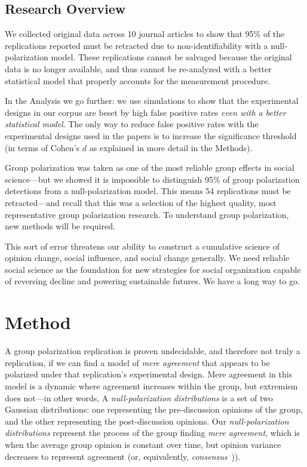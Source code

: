 \documentclass[preview]{article}
\begin{document}
\subsection{Research Overview}

We collected original data across 10 journal articles to show that 95\% of 
the replications reported must be retracted due to non-identifiability with a
null-polarization model. These replications cannot be salvaged because the
original data is no longer available, and thus cannot be re-analyzed with a 
better statistical model that properly accounts for the measurement procedure. 

In the Analysis we go further: we use simulations to show that 
the experimental designs in our corpus are beset by high false positive rates 
\emph{even with a better statistical model}. The only way to reduce false
positive rates with the experimental designs used in the papers is to increase
the significance threshold (in terms of Cohen's $d$ as explained in more
detail in the Methods).

Group polarization was taken as one of the most reliable group effects in social
science—but we showed it is impossible to distinguish 95\% of group
polarization detections from a null-polarization model. This means 54
replications must be retracted—and recall that this was a selection of the
highest quality, most representative group polarization research. 
To understand group polarization, new
methods will be required. 

This sort of error threatens our ability to construct a
cumulative science of opinion change, social influence, and social change
generally. We need reliable social science as the foundation for new
strategies for social organization capable of reversing decline and powering
sustainable futures. We have a long way to go.


\section{Method}

A group polarization replication is proven undecidable, and therefore
not truly a replication, if we can find a model of \emph{mere agreement}
that appears to be polarized under that replication's experimental
design. Mere agreement in this model is a dynamic
where agreement increases within the group, but extremism does not---in
other words, A \emph{null-polarization distributions} is a set of two
Gaussian distributions: one representing the pre-discussion opinions of
the group, and the other representing the post-discussion opinions. Our
\emph{null-polarization distributions} represent the process of the
group finding \emph{mere agreement}, which is when the average group
opinion is constant over time, but opinion variance decreases to
represent agreement (or, equivalently, \emph{consensus}~\cite{DeGroot1974})).
\end{document}
